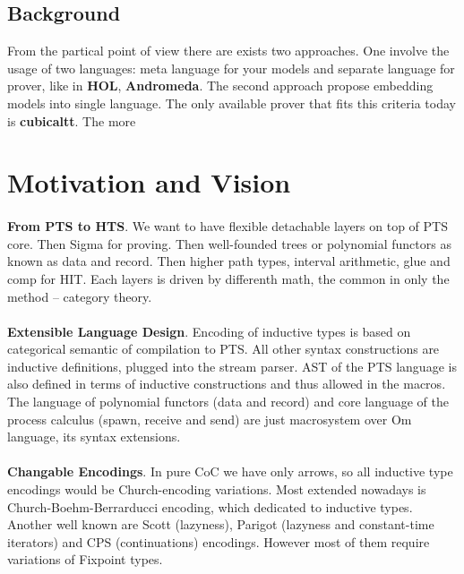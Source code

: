 \documentclass[11pt,oneside]{article}
\begin{document}
\subsection{Background}
From the partical point of view there are exists two approaches.
One involve the usage of two languages: meta language for your models
and separate language for prover, like in {\bf HOL}, {\bf Andromeda}.
The second approach propose embedding models into single language.  The only available prover that fits
this criteria today is {\bf cubicaltt}. The more 

\newpage
\section{Motivation and Vision}

\paragraph{}
{\bf From PTS to HTS}. We want to have flexible detachable
layers on top of PTS core. Then Sigma for proving.
Then well-founded trees or polynomial functors as known as data and record.
Then higher path types, interval arithmetic, glue and comp for HIT.
Each layers is driven by differenth math, the common in only the method -- category theory.

\paragraph{}
{\bf Extensible Language Design}. Encoding of inductive types is based on categorical
semantic of compilation to PTS. All other syntax constructions are inductive
definitions, plugged into the stream parser. AST of the PTS language is also
defined in terms of inductive constructions and thus allowed in the macros.
The language of polynomial functors (data and record) and core language of
the process calculus (spawn, receive and send) are just macrosystem over Om language,
its syntax extensions.

\paragraph{}
{\bf Changable Encodings}. In pure CoC we have only arrows, so all inductive type encodings would
be Church-encoding variations. Most extended nowadays is Church-Boehm-Berrarducci encoding,
which dedicated to inductive types. Another well known are Scott (lazyness),
Parigot (lazyness and constant-time iterators) and CPS (continuations) encodings.
However most of them require variations of Fixpoint types.
\end{document}
